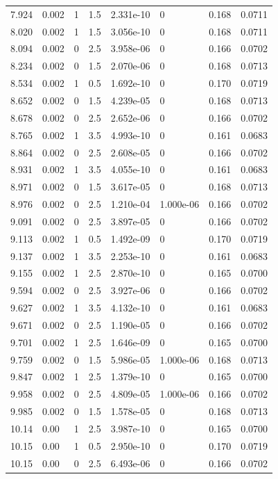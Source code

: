 \documentclass[preview]{standalone}
\begin{document}
{{{\begin{tabular}{L{1.2cm}C{1.2cm} C{0.3cm}C{0.5cm} C{1.4cm}C{1.4cm} C{1.4cm}C{1.4cm}}
  7.924  &  0.002  & 1     & 1.5 &  2.331e-10  & 0  & 0.168 &  0.0711   \\ 
  8.020  &  0.002  & 1     & 1.5 &  3.056e-10  & 0  & 0.168 &  0.0711   \\ 
  8.094  &  0.002  & 0     & 2.5 &  3.958e-06  & 0  & 0.166 &  0.0702   \\ 
  8.234  &  0.002  & 0     & 1.5 &  2.070e-06  & 0  & 0.168 &  0.0713   \\ 
  8.534  &  0.002  & 1     & 0.5 &  1.692e-10  & 0  & 0.170 &  0.0719   \\ 
  8.652  &  0.002  & 0     & 1.5 &  4.239e-05  & 0  & 0.168 &  0.0713   \\ 
  8.678  &  0.002  & 0     & 2.5 &  2.652e-06  & 0  & 0.166 &  0.0702   \\ 
  8.765  &  0.002  & 1     & 3.5 &  4.993e-10  & 0  & 0.161 &  0.0683   \\ 
  8.864  &  0.002  & 0     & 2.5 &  2.608e-05  & 0  & 0.166 &  0.0702   \\ 
  8.931  &  0.002  & 1     & 3.5 &  4.055e-10  & 0  & 0.161 &  0.0683   \\ 
  8.971  &  0.002  & 0     & 1.5 &  3.617e-05  & 0  & 0.168 &  0.0713   \\ 
  8.976  &  0.002  & 0     & 2.5 &  1.210e-04  & 1.000e-06  & 0.166 &  0.0702   \\ 
  9.091  &  0.002  & 0     & 2.5 &  3.897e-05  & 0  & 0.166 &  0.0702   \\ 
  9.113  &  0.002  & 1     & 0.5 &  1.492e-09  & 0  & 0.170 &  0.0719   \\ 
  9.137  &  0.002  & 1     & 3.5 &  2.253e-10  & 0  & 0.161 &  0.0683   \\ 
  9.155  &  0.002  & 1     & 2.5 &  2.870e-10  & 0  & 0.165 &  0.0700   \\ 
  9.594  &  0.002  & 0     & 2.5 &  3.927e-06  & 0  & 0.166 &  0.0702   \\ 
  9.627  &  0.002  & 1     & 3.5 &  4.132e-10  & 0  & 0.161 &  0.0683   \\ 
  9.671  &  0.002  & 0     & 2.5 &  1.190e-05  & 0  & 0.166 &  0.0702   \\ 
  9.701  &  0.002  & 1     & 2.5 &  1.646e-09  & 0  & 0.165 &  0.0700   \\ 
  9.759  &  0.002  & 0     & 1.5 &  5.986e-05  & 1.000e-06  & 0.168 &  0.0713   \\ 
  9.847  &  0.002  & 1     & 2.5 &  1.379e-10  & 0  & 0.165 &  0.0700   \\ 
  9.958  &  0.002  & 0     & 2.5 &  4.809e-05  & 1.000e-06  & 0.166 &  0.0702   \\ 
  9.985  &  0.002  & 0     & 1.5 &  1.578e-05  & 0  & 0.168 &  0.0713   \\ 
  10.14  &  0.00  & 1     & 2.5 &  3.987e-10  & 0  & 0.165 &  0.0700   \\ 
  10.15  &  0.00  & 1     & 0.5 &  2.950e-10  & 0  & 0.170 &  0.0719   \\ 
  10.15  &  0.00  & 0     & 2.5 &  6.493e-06  & 0  & 0.166 &  0.0702   \\ 
\hline 
\end{tabular} 

}}}
\end{document}
